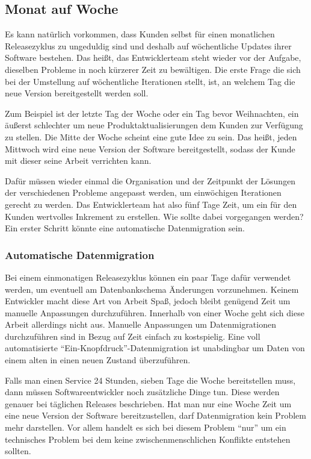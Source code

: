 \subsection{Monat auf Woche}
\label{subsec:monat-auf-woche}

Es kann natürlich vorkommen, dass Kunden selbst für einen monatlichen Releasezyklus zu ungeduldig sind und deshalb auf wöchentliche Updates ihrer Software bestehen. Das heißt, das Entwicklerteam steht wieder vor der Aufgabe, dieselben Probleme in noch kürzerer Zeit zu bewältigen. Die erste Frage die sich bei der Umstellung auf wöchentliche Iterationen stellt, ist, an welchem Tag die neue Version bereitgestellt werden soll.

Zum Beispiel ist der letzte Tag der Woche oder ein Tag bevor Weihnachten, ein äußerst schlechter um neue Produktaktualisierungen dem Kunden zur Verfügung zu stellen. Die Mitte der Woche scheint eine gute Idee zu sein. Das heißt, jeden Mittwoch wird eine neue Version der Software bereitgestellt, sodass der Kunde mit dieser seine Arbeit verrichten kann. 

Dafür müssen wieder einmal die Organisation und der Zeitpunkt der Lösungen der verschiedenen Probleme angepasst werden, um einwöchigen Iterationen gerecht zu werden. Das Entwicklerteam hat also fünf Tage Zeit, um ein für den Kunden wertvolles Inkrement zu erstellen. Wie sollte dabei vorgegangen werden? Ein erster Schritt könnte eine automatische Datenmigration sein.

\subsubsection{Automatische Datenmigration}

Bei einem einmonatigen Releasezyklus können ein paar Tage dafür verwendet werden, um eventuell am Datenbankschema Änderungen vorzunehmen. Keinem Entwickler macht diese Art von Arbeit Spaß, jedoch bleibt genügend Zeit um manuelle Anpassungen durchzuführen. Innerhalb von einer Woche geht sich diese Arbeit allerdings nicht aus. Manuelle Anpassungen um Datenmigrationen durchzuführen sind in Bezug auf Zeit einfach zu kostspielig. Eine voll automatisierte \enquote{Ein-Knopf\-druck}-Da\-ten\-mi\-gra\-tion ist unabdingbar um Daten von einem alten in einen neuen Zustand überzuführen. 

Falls man einen Service 24 Stunden, sieben Tage die Woche bereitstellen muss, dann müssen Softwareentwickler noch zusätzliche Dinge tun. Diese werden genauer bei täglichen Releases beschrieben. Hat man nur eine Woche Zeit um eine neue Version der Software bereitzustellen, darf Datenmigration kein Problem mehr darstellen. Vor allem handelt es sich bei diesem Problem \enquote{nur} um ein  technisches Problem bei dem keine zwischenmenschlichen Konflikte entstehen sollten. 

